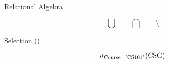 \begin{frame}{}
  \centerline{\LARGE Relational Algebra}

  \vspace{0.30cm}

  \pause
  \centerline{\Large {}}
\end{frame}

\begin{frame}{}
  \[
    \bigcup \qquad \bigcap \qquad \setminus
  \]
\end{frame}

\begin{frame}{}
  \centerline{\Large Selection (\blue{$\sigma$})}

  \[
    \sigma_{\text{\text{Course}} = '\text{CS}101{}'} (\text{CSG}{})
  \]

  \begin{columns}
  \end{columns}
\end{frame}

\begin{frame}{}
\end{frame}

\begin{frame}{}
\end{frame}

\begin{frame}{}
\end{frame}

\begin{frame}{}
\end{frame}
